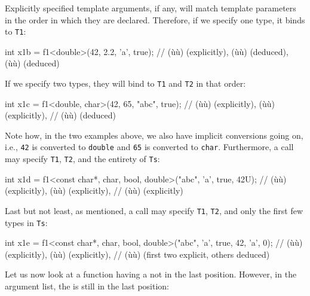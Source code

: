 \noindent Explicitly specified template arguments, if any, will match template
parameters in the order in which they are declared. Therefore, if we
specify one type, it binds to \lstinline!T1!:

\begin{emcppslisting}
int x1b = f1<double>(42, 2.2, 'a', true);
    // (ù{}ù) (explicitly), (ù{}ù) (deduced), (ù{}ù) (deduced)
\end{emcppslisting}
    

\noindent If we specify two types, they will bind to \lstinline!T1! and \lstinline!T2!
in that order:

\begin{emcppslisting}
int x1c = f1<double, char>(42, 65, "abc", true);
    // (ù{}ù) (explicitly), (ù{}ù) (explicitly),
    // (ù{}ù) (deduced)
\end{emcppslisting}
    

\noindent Note how, in the two examples above, we also have implicit conversions
going on, i.e., \lstinline!42! is converted to \lstinline!double! and
\lstinline!65! is converted to \lstinline!char!. Furthermore, a call may
specify \lstinline!T1!, \lstinline!T2!, and the entirety of \lstinline!Ts!:

\begin{emcppslisting}
int x1d = f1<const char*, char, bool, double>("abc", 'a', true, 42U);
    // (ù{}ù) (explicitly), (ù{}ù) (explicitly),
    // (ù{}ù) (explicitly)
\end{emcppslisting}
    

\noindent Last but not least, as mentioned, a call may specify \lstinline!T1!,
\lstinline!T2!, and only the first few types in \lstinline!Ts!:

\begin{emcppslisting}
int x1e = f1<const char*, char, bool, double>("abc", 'a', true, 42, 'a', 0);
    // (ù{}ù) (explicitly), (ù{}ù) (explicitly),
    // (ù{}ù) (first two explicit, others deduced)
\end{emcppslisting}
    

\noindent Let us now look at a function having a 
not in the last position. However, in the argument list, the
 is still in the last position:

